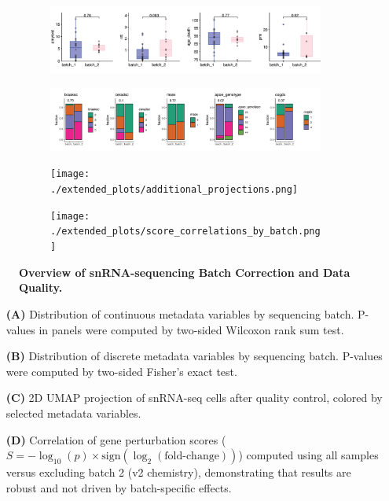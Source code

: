 \begin{figure}[H]
    \begin{subfigure}[t]{\textwidth}
        \caption{}
        \includegraphics[width=\textwidth]{./extended_plots/seq_batch_cont.png}        
    \end{subfigure}
    \begin{subfigure}[t]{\textwidth}
        \caption{}
        \includegraphics[width=\textwidth]{./extended_plots/seq_batch_cat.png}        
    \end{subfigure}  
    \begin{subfigure}[t]{\textwidth}
        \caption{}
        \texttt{[image: ./extended\_plots/additional\_projections.png]}        
    \end{subfigure}   
    \begin{subfigure}[t]{\textwidth}
        \caption{}
        \texttt{[image: ./extended\_plots/score\_correlations\_by\_batch.png]}        
    \end{subfigure}   
    \caption{
        \textbf{Overview of snRNA-sequencing Batch Correction and Data Quality.}\\
    }
    \label{fig:snRNA_batch_quality}
\end{figure}
\begin{itemize}
    \item[\textbf{(A)}] Distribution of continuous metadata variables by sequencing batch. P-values in panels were computed by two-sided Wilcoxon rank sum test.
    \item[\textbf{(B)}] Distribution of discrete metadata variables by sequencing batch. P-values were computed by two-sided Fisher's exact test.
    \item[\textbf{(C)}] 2D UMAP projection of snRNA-seq cells after quality control, colored by selected metadata variables.
    \item[\textbf{(D)}] Correlation of gene perturbation scores ($S = -\log_{10}(p)\times\text{sign}(\log_2(\text{fold-change}))$) computed using all samples versus excluding batch 2 (v2 chemistry), demonstrating that results are robust and not driven by batch-specific effects.
\end{itemize}
